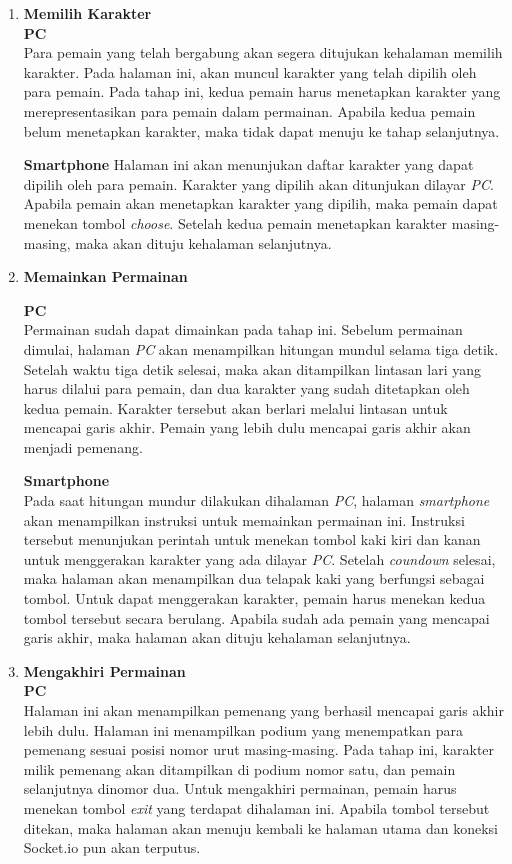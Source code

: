 \begin{enumerate}
	\item \textbf{Memilih Karakter} \\
	
	\textbf{PC} \\
	Para pemain yang telah bergabung akan segera ditujukan kehalaman memilih karakter. Pada halaman ini, akan muncul karakter yang telah dipilih oleh para pemain. Pada tahap ini, kedua pemain harus menetapkan karakter yang merepresentasikan para pemain dalam permainan. Apabila kedua pemain belum menetapkan karakter, maka tidak dapat menuju ke tahap selanjutnya.
	
	\textbf{Smartphone}
	Halaman ini akan menunjukan daftar karakter yang dapat dipilih oleh para pemain. Karakter yang dipilih akan ditunjukan dilayar \textit{PC}. Apabila pemain akan menetapkan karakter yang dipilih, maka pemain dapat menekan tombol \textit{choose}. Setelah kedua pemain menetapkan karakter masing-masing, maka akan dituju kehalaman selanjutnya.
	
	\item \textbf{Memainkan Permainan}
	
	\textbf{PC} \\
	Permainan sudah dapat dimainkan pada tahap ini. Sebelum permainan dimulai, halaman \textit{PC} akan menampilkan hitungan mundul selama tiga detik. Setelah waktu tiga detik selesai, maka akan ditampilkan lintasan lari yang harus dilalui para pemain, dan dua karakter yang sudah ditetapkan oleh kedua pemain. Karakter tersebut akan berlari melalui lintasan untuk mencapai garis akhir. Pemain yang lebih dulu mencapai garis akhir akan menjadi pemenang.
	
	\textbf{Smartphone} \\
	Pada saat hitungan mundur dilakukan dihalaman \textit{PC}, halaman \textit{smartphone} akan menampilkan instruksi untuk memainkan permainan ini. Instruksi tersebut menunjukan perintah untuk menekan tombol kaki kiri dan kanan untuk menggerakan karakter yang ada dilayar \textit{PC}. Setelah \textit{coundown} selesai, maka halaman akan menampilkan dua telapak kaki yang berfungsi sebagai tombol. Untuk dapat menggerakan karakter, pemain harus menekan kedua tombol tersebut secara berulang. Apabila sudah ada pemain yang mencapai garis akhir, maka halaman akan dituju kehalaman selanjutnya.
	
	\item \textbf{Mengakhiri Permainan} \\
	
	\textbf{PC} \\
	Halaman ini akan menampilkan pemenang yang berhasil mencapai garis akhir lebih dulu. Halaman ini menampilkan podium yang menempatkan para pemenang sesuai posisi nomor urut masing-masing. Pada tahap ini, karakter milik pemenang akan ditampilkan di podium nomor satu, dan pemain selanjutnya dinomor dua. Untuk mengakhiri permainan, pemain harus menekan tombol \textit{exit} yang terdapat dihalaman ini. Apabila tombol tersebut ditekan, maka halaman akan menuju kembali ke halaman utama dan koneksi Socket.io pun akan terputus.
	

\end{enumerate}

